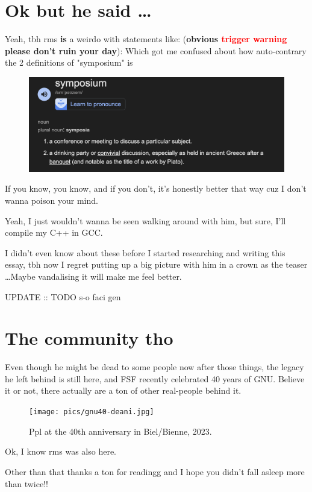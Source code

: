 \documentclass[sigplan,screen]{acmart}
\begin{document}
\section{Ok but he said \ldots}
Yeah, tbh rms {\large \textbf{is}} a weirdo with statements like: (\textbf{obvious \textcolor{red}{trigger warning} please don't ruin your day}): \cite{bro-wtf-1} \cite{bro-wtf-2} \cite{bro-wtf-3} \cite{bro-wtf-toate}
Which got me confused about how auto-contrary the 2 definitions of "symposium" is
\begin{figure}[H]
	\centering
	\includegraphics[width=\columnwidth]{pics/symposium.png}	
	\label{fig:symposium-def}
\end{figure}
If you know, you know, and if you don't, it's honestly better that way cuz I don't wanna poison your mind.

Yeah, I just wouldn't wanna be seen walking around with him, but sure, I'll compile my C++ in GCC.

I didn't even know about these before I started researching and writing this essay, tbh now I regret putting up a big picture with him in a crown as the teaser \ldots Maybe vandalising it will make me feel better.

UPDATE :: TODO s-o faci gen
\section{The community tho}
Even though he might be dead to some people now after those things, the legacy he left behind is still here, and FSF recently celebrated 40 years of GNU. Believe it or not, there actually are a ton of other real-people behind it. \cite{gnu-forty-years}
\begin{figure}[H]
	\texttt{[image: pics/gnu40-deani.jpg]}	
	\caption{Ppl at the 40th anniversary in Biel/Bienne, 2023.}
	\label{fig:gnu-anniversary}	
\end{figure}
Ok, I know rms was also here. \cite{gnu-forty-years-stallman}

Other than that thanks a ton for readingg and I hope you didn't fall asleep more than twice!!




\end{document}
